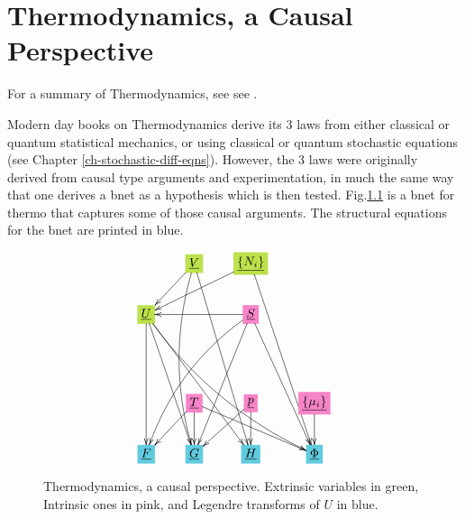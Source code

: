 \chapter{\;\;Thermodynamics, a Causal Perspective}
\label{ch-thermo}

For a summary of Thermodynamics, see
see \cite{wiki-thermo}.

Modern day books on Thermodynamics
derive its 3 laws from either classical
or quantum statistical mechanics, or using classical or quantum stochastic  equations
(see Chapter \ref{ch-stochastic-diff-eqns}). However,
the 3 laws 
were originally derived from causal type
	arguments and experimentation, in much
	the same way that one  derives a bnet
	as a hypothesis which is then tested.
Fig.\ref{fig-texnn-for-thermo} is a bnet for thermo that
captures some of those causal arguments.
The structural equations for the bnet are printed in blue.

	


\begin{figure}[h!]\centering
	$$\xymatrix{
		&*+[F*:SpringGreen]{\underline{V}}\ar@/_1pc/[dddd]\ar[ddddr]\ar[dl]&*+[F*:SpringGreen]{\underline{\{N_i\}}}\ar[ddddr]\ar[dll]&
		\\
		*+[F*:SpringGreen]{\underline{U}}\ar@/_1pc/[dddrrr]\ar[ddd]\ar[dddr]\ar[dddrr]&&*+[F*:Lavender]{\underline{S}}\ar[dddr]\ar@/_1pc/[dddll]\ar[dddl]\ar[ll]&
		\\
		&&&
		\\
		&*+[F*:Lavender]{\underline{T}}\ar[drr]\ar[dl]\ar[d]&*+[F*:Lavender]{\underline{p}}\ar[dl]\ar[d]&*+[F*:Lavender]{\underline{\{\mu_i\}}}\ar[d]
		\\
		*+[F*:SkyBlue]{\underline{F}}&*+[F*:SkyBlue]{\underline{G}}&*+[F*:SkyBlue]{\underline{H}}&*+[F*:SkyBlue]{\underline{\Phi}}
	}$$
	\caption{Thermodynamics, a causal perspective. Extrinsic variables in green, Intrinsic ones in pink, and Legendre  transforms of $U$ in blue.}
	\label{fig-texnn-for-thermo}
\end{figure}

